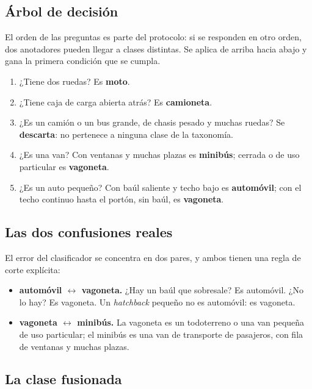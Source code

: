 \subsection{Árbol de decisión}

El orden de las preguntas es parte del protocolo: si se responden en otro orden,
dos anotadores pueden llegar a clases distintas. Se aplica de arriba hacia abajo y
gana la primera condición que se cumpla.

\begin{enumerate}
    \item ¿Tiene dos ruedas? Es \textbf{moto}.
    \item ¿Tiene caja de carga abierta atrás? Es \textbf{camioneta}.
    \item ¿Es un camión o un bus grande, de chasis pesado y muchas ruedas? Se
        \textbf{descarta}: no pertenece a ninguna clase de la taxonomía.
    \item ¿Es una van? Con ventanas y muchas plazas es \textbf{minibús}; cerrada o
        de uso particular es \textbf{vagoneta}.
    \item ¿Es un auto pequeño? Con baúl saliente y techo bajo es
        \textbf{automóvil}; con el techo continuo hasta el portón, sin baúl, es
        \textbf{vagoneta}.
\end{enumerate}

\subsection{Las dos confusiones reales}

El error del clasificador se concentra en dos pares, y ambos tienen una regla de
corte explícita:

\begin{itemize}
    \item \textbf{automóvil $\leftrightarrow$ vagoneta.} ¿Hay un baúl que
        sobresale? Es automóvil. ¿No lo hay? Es vagoneta. Un \textit{hatchback}
        pequeño no es automóvil: es vagoneta.
    \item \textbf{vagoneta $\leftrightarrow$ minibús.} La vagoneta es un
        todoterreno o una van pequeña de uso particular; el minibús es una van de
        transporte de pasajeros, con fila de ventanas y muchas plazas.
\end{itemize}

\subsection{La clase fusionada}

